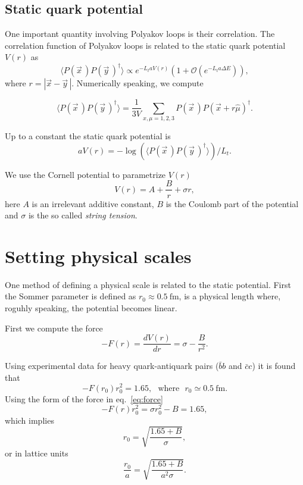 \documentclass[12pt,a4paper]{article}
\begin{document}
\subsection{Static quark potential}
One important quantity involving Polyakov loops is their correlation. The correlation function of Polyakov loops is related to the static quark potential $V(r)$ as
\begin{equation}
	\langle P(\vec{x}\,) P(\vec{y}\,)^{\dagger} \rangle \propto e^{-L_t a V(r)} \left(1 +\mathcal{O}\left( e^{-L_t a \Delta E}\right) \right),
\end{equation}
where $r = |\vec{x} - \vec{y}\,|$. Numerically speaking, we compute

\begin{equation}
	\langle P(\vec{x}\,) P(\vec{y}\,)^{\dagger} \rangle = \frac{1}{3V}\sum_{x,\mu = 1,2,3}  P(\vec{x}\,) P\left(\vec{x}+r\hat{\mu}\right)^{\dagger}.
\end{equation}

 Up to a constant the static quark potential is
\begin{equation}
	aV(r) = - \log(\langle P(\vec{x}\,) P(\vec{y}\,)^{\dagger} \rangle)/L_t.
\end{equation}

We use the Cornell potential to parametrize $V(r)$
\begin{equation}
	V(r) = A + \frac{B}{r} + \sigma r,
\end{equation}
here $A$ is an irrelevant additive constant, $B$ is the Coulomb part of the potential and $\sigma$ is the so called \textit{string tension}.

\section{Setting physical scales}
One method of defining a physical scale is related to the static potential. First the Sommer parameter is defined as $r_0 \approx 0.5 \ \text{fm}$, is a physical length where, roguhly speaking, the potential becomes linear.

First we compute the force 
\begin{equation}
	\label{eq:force}
	-F(r) = \frac{dV(r)}{dr} = \sigma - \frac{B}{r^2}.
\end{equation}

Using experimental data for heavy quark-antiquark pairs ($\bar{b}b$ and $\bar{c}c$) it is found that 
\begin{equation}
	-F(r_0)r_0^2 = 1.65, \ \ \ \text{where} \ \ \ r_0 \simeq 0.5 \ \text{fm}.
\end{equation}
Using the form of the force in eq.\ \eqref{eq:force} 
	\begin{equation}
		-F(r)r_0^2 = \sigma r_0^2 - B = 1.65,
	\end{equation}
which implies
	\begin{equation}
		r_0 = \sqrt{\frac{1.65+B}{\sigma}},
	\end{equation}
or in lattice units
	\begin{equation}
		\frac{r_0}{a} = \sqrt{\frac{1.65+B}{a^2\sigma}}.
	\end{equation}
\end{document}
